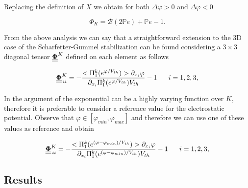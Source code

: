 Replacing the definition of $X$ we obtain for both $\Delta \varphi > 0$ and $\Delta \varphi < 0$

\begin{equation}
\Phi_K = \mathcal{B}(2\mathbb{P}e) + \mathbb{P}e -1.
\end{equation}


From the above analysis we can say that a straightforward extension to the 3D case of the Scharfetter-Gummel stabilization can be found considering a $3\times 3$ diagonal tensor  $\underline{\underline{\mathbf{\Phi}}}^K$  defined on each element as follows

\begin{equation}
\label{eq: SG stabilized}
\underline{\underline{\vect{\Phi}}}^K_{\, ii} = -\dfrac{<\Pi_1^k(e^{\varphi/V_{th}})> \partial_{x_i}\varphi}{\partial_{x_i}\Pi_1^k(e^{\varphi/V_{th}})V_{th}} -1 \psp{10} i = 1,2,3,
\end{equation}

In  the argument of the exponential can be a highly varying function over $K$, therefore it is preferable to consider a reference value for the electrostatic potential.
 Observe that $\varphi \in [\varphi_{min},\varphi_{max}]$ and therefore we can use one of these values as reference and obtain
 
 \begin{equation}
\label{eq: SG stabilized}
\underline{\underline{\vect{\Phi}}}^K_{\, ii}  = -\dfrac{<\Pi_1^k(e^{(\varphi-\varphi_{min})/V_{th}})> \partial_{x_i}\varphi}{\partial_{x_i}\Pi_1^k(e^{(\varphi-\varphi_{min})/V_{th}})V_{th}} -1 \psp{10} i = 1,2,3,
\end{equation}

\subsection{Results}

